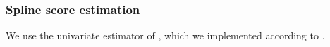 \documentclass[aos]{imsart}
\newcommand{\R}{\mathbb{R}}
\newtheorem{theorem}{Theorem}
\begin{document}
	\subsubsection{Spline score estimation}
	We use the univariate estimator of \cite{CoxSpline}, which we implemented according to \cite{NgSpline, NgSplineImplementation}.
%	
\end{document}

